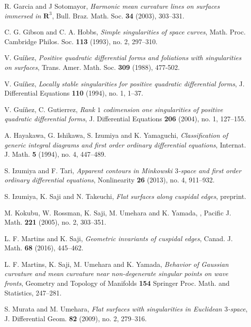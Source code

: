 \documentclass[a4paper, 12pt]{article}
\theoremstyle{definition}
\numberwithin{equation}{section}
\begin{document}
\begin{thebibliography}{99}
R. Garcia and J Sotomayor,
{\itshape Harmonic mean curvature lines on surfaces 
immersed in\/ ${\boldsymbol{R}}^3$},
Bull. Braz. Math. Soc. {\bf 34} (2003), 303--331.

C. G. Gibson and C. A. Hobbs,
{\it Simple singularities of space curves},
Math. Proc. Cambridge Philos. Soc. {\bf 113} (1993), no. 2, 297--310.

V. Gu\'i\~{n}ez, 
{\itshape Positive quadratic differential forms
and foliations with singularities on surfaces},
Trans. Amer. Math. Soc. {\bf 309} (1988), 477-502.

V. Gu\'i\~{n}ez,
{\itshape Locally stable singularities for positive quadratic 
differential forms},
J. Differential Equations {\bf 110} (1994), no. 1, 1--37.

V. Gu\'i\~nez, C. Gutierrez,
{\itshape Rank\/ $1$ codimension one singularities of positive 
quadratic differential forms},
J. Differential Equations {\bf 206} (2004), no. 1, 127--155.

A. Hayakawa, G. Ishikawa, S. Izumiya and K. Yamaguchi,
{\itshape Classification of generic integral diagrams 
and first order ordinary differential equations},
Internat. J. Math. {\bf 5} (1994), no. 4, 447--489.

S. Izumiya and F. Tari,
{\itshape Apparent contours in Minkowski\/ $3$-space and 
first order ordinary differential equations},
Nonlinearity {\bf 26} (2013), no. 4, 911--932.

S. Izumiya, K. Saji and N. Takeuchi,
{\itshape Flat surfaces along cuspidal edges},
preprint.

M. Kokubu, W. Rossman, K. Saji, M. Umehara and K. Yamada,
,
\newblock Pacific J. Math. {\bf 221} (2005), no. 2, 303--351.

L. F. Martins and K. Saji,
{\itshape Geometric invariants of cuspidal edges},
Canad. J. Math. {\bf 68} (2016), 445--462.

L. F. Martins, K. Saji, M. Umehara and K. Yamada, 
{\itshape Behavior of Gaussian curvature and 
mean curvature near non-degenerate singular 
points on wave fronts}, 
Geometry and Topology of Manifolds
{\bf 154}
Springer Proc. Math. and Statistics, 247--281.

S. Murata and M. Umehara,
{\itshape Flat surfaces with singularities in Euclidean\/ $3$-space},
J. Differential Geom. {\bf 82} (2009), no. 2, 279--316.


\end{thebibliography}
\end{document}

